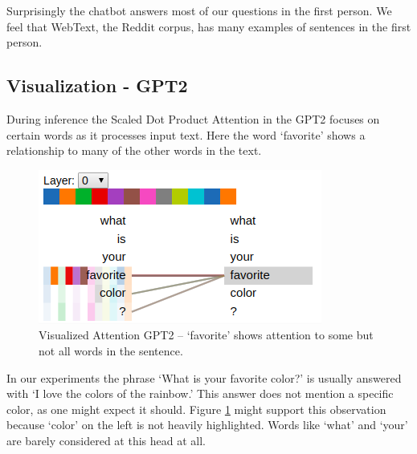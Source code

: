 Surprisingly the chatbot answers most of our questions in the first person. We feel that WebText, the Reddit corpus, has many examples of sentences in the first person.

\subsection{Visualization - GPT2}

During inference the Scaled Dot Product Attention in the GPT2 focuses on certain words as it processes input text. Here the word `favorite' shows a relationship to many of the other words in the text.  

\begin{figure}[H]
	\begin{center}
		\includegraphics[scale=2]{Figure_4}
		
		
	\end{center}
	\caption[Visualized Attention GPT2]{Visualized Attention GPT2 -- `favorite' shows attention to some but not all words in the sentence.}
	\label{diagram-vis04}
	
\end{figure}

In our experiments the phrase `What is your favorite color?' is usually answered with `I love the colors of the rainbow.' This answer does not mention a specific color, as one might expect it should. Figure \ref{diagram-vis04} might support this observation because `color' on the left is not heavily highlighted. Words like `what' and `your' are barely considered at this head at all. 

